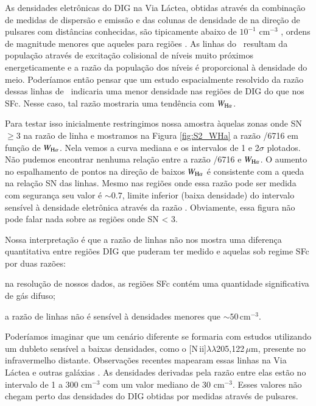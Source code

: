 As densidades eletrônicas do DIG na Via Láctea, obtidas através da combinação de medidas de dispersão e emissão e das colunas de densidade de \hi na direção de pulsares com distâncias conhecidas, são tipicamente abaixo de $10^{-1}$ cm$^{-3}$ \citep{Berk.and.Fletcher.2008}, ordens de magnitude menores que aqueles para regiões \hii.
As linhas do \Sii\ resultam da população através de excitação colisional de níveis muito próximos energeticamente e a razão da população dos níveis  é proporcional à densidade do meio.
Poderíamos então pensar que um estudo espacialmente resolvido da razão dessas linhas de \sii\ indicaria uma menor densidade nas regiões de DIG do que nos SFc. Nesse caso, tal razão mostraria uma tendência com $W_{\Ha}$.

Para testar isso inicialmente restringimos nossa amostra àquelas zonas onde SN $\ge 3$ na razão de linha \sii e mostramos na Figura \ref{fig:S2_WHa} a razão /6716 em função de $W_{\Ha}$. Nela vemos a curva mediana e os intervalos de 1 e 2$\sigma$ plotados. Não pudemos encontrar nenhuma relação entre a razão /6716 e $W_{\Ha}$. O aumento no espalhamento de pontos na direção de baixos $W_{\Ha}$ é consistente com a queda na relação SN das linhas. Mesmo nas regiões onde essa razão pode ser medida com segurança seu valor é $\sim 0.7$, limite inferior (baixa densidade) do intervalo sensível à densidade eletrônica através da razão \sii. Obviamente, essa figura não pode falar nada sobre as regiões onde SN < 3.

Nossa interpretação é que a razão de linhas \sii não nos mostra uma diferença quantitativa entre regiões DIG que puderam ter \sii medido e aquelas sob regime SFc por duas razões:
\begin{enumerate*}[label=(\roman*)]
    \item na resolução de nossos dados, as regiões SFc contém uma quantidade significativa de gás difuso;
    \item a razão de linhas \sii não é sensível à densidades menores que $\sim 50$\,cm$^{-3}$.
\end{enumerate*}

Poderíamos imaginar que um cenário diferente se formaria com estudos utilizando um dubleto sensível a baixas densidades, como o [N\,{\sc ii}]$\lambda\lambda$205,122\,$\mu$m, presente no infravermelho distante. Observações recentes mapearam essas linhas na Via Láctea e outras galáxias \citep{Goldsmith.etal.2015, HerreraCamus.etal.2016}. As densidades derivadas pela razão entre elas estão no intervalo de 1 a 300 cm$^{-3}$ com um valor mediano de 30 cm$^{-3}$. Esses valores não chegam perto das densidades do DIG obtidas por medidas através de pulsares.

